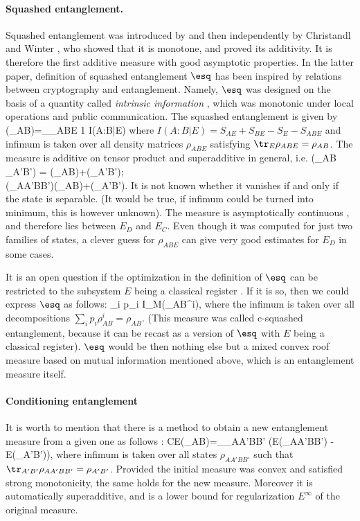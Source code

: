 \documentclass[rmp,12pt,preprint]{revtex4-2}
\begin{document}
\paragraph{Squashed entanglement.}
Squashed entanglement was introduced by  \cite{Tucci2002-squashed}
and then independently by Christandl and Winter
\cite{Winter-squashed-ent}, who showed that it is monotone, and
proved its additivity. It is therefore the  first additive measure
with good asymptotic properties. In the latter paper, definition of squashed
entanglement $\esq$ has been inspired by relations between
cryptography and entanglement. Namely, $\esq$ was designed on the
basis of a quantity called {\it intrinsic information}
\cite{MauWol97c-intr,GisinWolf_linking,renner-wolf-gap}, which was
monotonic under local operations and public communication. The
squashed entanglement is given by \be
\esq(\rho_{AB})=\inf_{\rho_{ABE}} {1} I(A:B|E) \ee
where $I(A:B|E)= S_{AE}+S_{BE}-S_E - S_{ABE}$ and infimum is
taken over all density matrices $\rho_{ABE}$ satisfying $\tr_E
\rho_{ABE}=\rho_{AB}$. The measure is additive on tensor product
and superadditive in general, i.e. \ben
\esq(\rho_{AB} \ot \rho_{A'B'}) = \esq(\rho_{AB})+\esq(\rho_{A'B'});\quad \nonumber\\
\esq(\rho_{AA'BB'})\geq  \esq(\rho_{AB})+\esq(\rho_{A'B'}). \een
It is not known whether it vanishes if and only if the state
is separable. (It would be true, if infimum could be turned into
minimum, this is however unknown). The measure is asymptotically
continuous \cite{Alicki-Fannes}, and therefore lies between $E_D$
and $E_C$.  Even though it was computed for just two families of
states, a clever guess for $\rho_{ABE}$ can give very good estimates
for $E_D$ in some cases.


It is an open question if the optimization in the definition of
$\esq$ can be restricted to the subsystem $E$ being a classical
register \cite{Tucci2002-squashed}. If it is so, then we could
express $\esq$ as follows: \be \esq{}\inf \sum_i p_i
I_M(\rho_{AB}^i), \ee where the infimum is taken over all
decompositions $\sum_i p_i \rho^i_{AB} =\rho_{AB}$. (This measure was  called c-squashed entanglement, because it can be recast as a version of $\esq$ with  $E$ being a classical register). $\esq$ would be then
nothing else but a mixed convex roof measure based on mutual information mentioned above, which is an entanglement measure itself.

\paragraph{Conditioning entanglement}
It is worth to mention that there is a method to obtain a new entanglement measure from a given one as follows \cite{DongHW2007-cond-ent}:
\be
CE(\rho_{AB})=\inf_{\rho_{AA'BB'}} (E(\rho_{AA'BB'}) - E(\rho_{A'B'})),
\ee
where infimum is taken over all states $\rho_{AA'BB'}$ such that $\tr_{A'B'}\rho_{AA'BB'}=\rho_{A'B'}$.
Provided the initial measure was convex and satisfied strong monotonicity,
the same holds for the new measure. Moreover it is automatically superadditive, and is a lower bound for regularization $E^{\infty}$ of the original measure.
\end{document}
